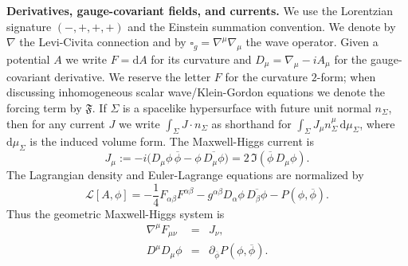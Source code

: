 \documentclass[10pt,a4paper]{amsart}
\newcommand{\dd}{\mathrm{d}}
\begin{document}
\medskip
\noindent\textbf{Derivatives, gauge-covariant fields, and currents.}
We use the Lorentzian signature $(-,+,+,+)$ and the Einstein summation convention.
We denote by $\nabla$ the Levi-Civita connection and by $\square_{g}=\nabla^{\mu}\nabla_{\mu}$ the wave operator.
Given a potential $A$ we write $F=\dd A$ for its curvature and $D_{\mu}=\nabla_{\mu}-iA_{\mu}$ for the gauge-covariant derivative.
We reserve the letter $F$ for the curvature $2$-form; when discussing inhomogeneous scalar wave/Klein-Gordon equations we denote the forcing term by $\mathfrak{F}$.
If $\Sigma$ is a spacelike hypersurface with future unit normal $n_{\Sigma}$, then for any current $J$ we write
$\int_{\Sigma}J\cdot n_{\Sigma}$ as shorthand for $\int_{\Sigma}J_{\mu}n_{\Sigma}^{\mu}\,\dd\mu_{\Sigma}$, where $\dd\mu_{\Sigma}$ is the induced volume form.
The Maxwell-Higgs current is
\begin{equation}\label{eq:mh-current}
J_{\mu}:=-i\bigl(D_{\mu}\phi\,\overline\phi-\phi\,\overline{D_{\mu}\phi}\bigr)=2\,\Im(\overline\phi\,D_{\mu}\phi).
\end{equation}
The Lagrangian density and Euler-Lagrange equations are normalized by
\begin{equation}\label{lagrangian}
\mathcal L[A,\phi]
=-\frac14 F_{\alpha\beta}F^{\alpha\beta}
-g^{\alpha\beta}D_{\alpha}\phi\,\overline{D_{\beta}\phi}
-P(\phi,\overline\phi).
\end{equation}
Thus the geometric Maxwell-Higgs system is
\begin{eqnarray}
\nabla^{\mu}F_{\mu\nu}&=&J_{\nu},
\label{eom1}\\
D^{\mu}D_{\mu}\phi&=&\partial_{\overline\phi}P(\phi,\overline\phi).
\label{eom2}
\end{eqnarray}
\end{document}
